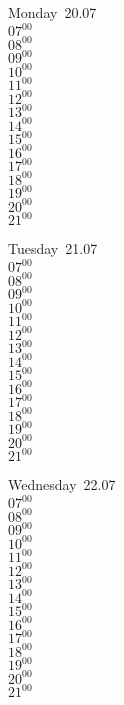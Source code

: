 \documentclass[11pt,a4paper]{book}\usepackage[]{graphicx}\usepackage[]{color}
\begin{document}
\begin{headerbox}
\end{headerbox}
\begin{weekdaybox}
  Monday~20.07\\
  { 
  \vfill
  $07^{00}$\\
$08^{00}$\\
$09^{00}$\\
$10^{00}$\\
$11^{00}$\\
$12^{00}$\\
$13^{00}$\\
$14^{00}$\\
$15^{00}$\\
$16^{00}$\\
$17^{00}$\\
$18^{00}$\\
$19^{00}$\\
$20^{00}$\\
$21^{00}$\\
  }
\end{weekdaybox}
\begin{weekdaybox}
  Tuesday~21.07\\
  { 
  \vfill
  $07^{00}$\\
$08^{00}$\\
$09^{00}$\\
$10^{00}$\\
$11^{00}$\\
$12^{00}$\\
$13^{00}$\\
$14^{00}$\\
$15^{00}$\\
$16^{00}$\\
$17^{00}$\\
$18^{00}$\\
$19^{00}$\\
$20^{00}$\\
$21^{00}$\\
  }
\end{weekdaybox}
\begin{weekdaybox}
  Wednesday~22.07\\
  { 
  \vfill
  $07^{00}$\\
$08^{00}$\\
$09^{00}$\\
$10^{00}$\\
$11^{00}$\\
$12^{00}$\\
$13^{00}$\\
$14^{00}$\\
$15^{00}$\\
$16^{00}$\\
$17^{00}$\\
$18^{00}$\\
$19^{00}$\\
$20^{00}$\\
$21^{00}$\\
  }
\end{weekdaybox}
\end{document}
